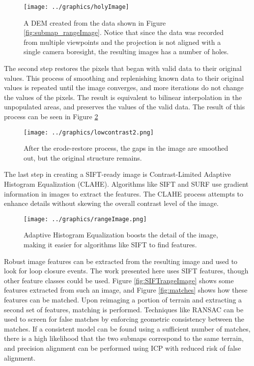 \begin{figure}[htb]
   \centering
   \texttt{[image: ../graphics/holyImage]} %
   \caption{A DEM created from the data shown in Figure \ref{fig:submap_rangeImage}. Notice that since the data was recorded from multiple viewpoints and the projection is not aligned with a single camera boresight, the resulting images has a number of holes.}
   \label{fig:holyImage}
\end{figure}

The second step restores the pixels that began with valid data to their original values. This process of smoothing and replenishing known data to their original values is repeated until the image converges, and more iterations do not change the values of the pixels. The result is equivalent to bilinear interpolation in the unpopulated areas, and preserves the values of the valid data. The result of this process can be seen in Figure \ref{fig:rangeImage}

\begin{figure}[htb]
   \centering
   \texttt{[image: ../graphics/lowcontrast2.png]} %
   \caption{After the erode-restore process, the gaps in the image are smoothed out, but the original structure remains.}
   \label{fig:rangeImage}
\end{figure}

The last step in creating a SIFT-ready image is Contrast-Limited Adaptive Histogram Equalization (CLAHE). Algorithms like SIFT and SURF use gradient information in images to extract the features. The CLAHE process attempts to enhance details without skewing the overall contrast level of the image. \cite{Reza2004}

\begin{figure}[htb]
   \centering
   \texttt{[image: ../graphics/rangeImage.png]} %
   \caption{Adaptive Histogram Equalization boosts the detail of the image, making it easier for algorithms like SIFT to find features.}
   \label{fig:rangeImageHC}
\end{figure}

Robust image features can be extracted from the resulting image and used to look for loop closure events. The work presented here uses SIFT features, though other feature classes could be used. Figure \ref{fig:SIFTrangeImage} shows some features extracted from such an image, and Figure \ref{fig:matches} shows how these features can be matched. Upon reimaging a portion of terrain and extracting a second set of features, matching is performed. Techniques like RANSAC can be used to screen for false matches by enforcing geometric consistency between the matches. If a consistent model can be found using a sufficient number of matches, there is a high likelihood that the two submaps correspond to the same terrain, and precision alignment can be performed using ICP with reduced risk of false alignment. 

